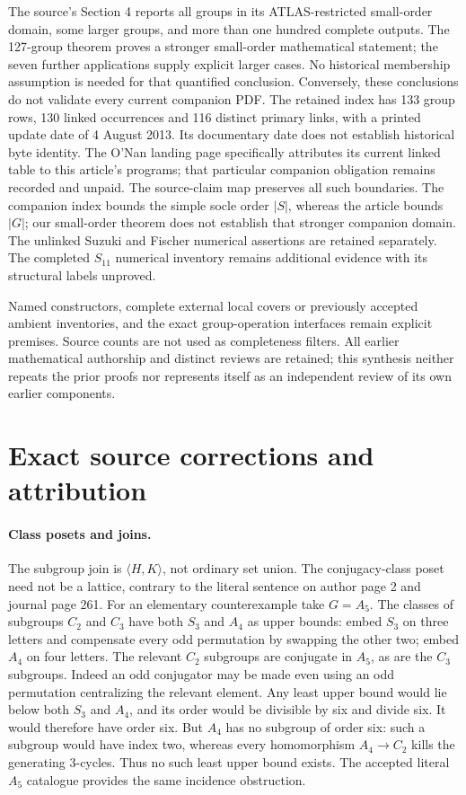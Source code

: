 \documentclass[11pt]{article}
\begin{document}
The source's Section 4 reports all groups in its ATLAS-restricted small-order
domain, some larger groups, and more than one hundred complete outputs.
The 127-group theorem proves a stronger small-order mathematical statement;
the seven further applications supply explicit larger cases. No historical
membership assumption is needed for that quantified conclusion. Conversely,
these conclusions do not validate every current companion PDF. The retained
index has 133 group rows, 130 linked occurrences and 116 distinct primary
links, with a printed update date of 4 August 2013. Its documentary date
does not establish historical byte identity. The O'Nan landing page
specifically attributes its current linked table to this article's programs;
that particular companion obligation remains recorded and unpaid. The
source-claim map preserves all such boundaries. The companion index bounds
the simple socle order $|S|$, whereas the article bounds $|G|$; our
small-order theorem does not establish that stronger companion domain.
The unlinked
Suzuki and Fischer numerical assertions are retained separately. The completed $S_{11}$ numerical
inventory remains additional evidence with its structural labels unproved.

Named constructors, complete external local covers or previously accepted
ambient inventories, and the exact group-operation interfaces remain
explicit premises. Source counts are not used as completeness filters.
All earlier mathematical authorship and distinct reviews are retained;
this synthesis neither repeats the prior proofs nor represents itself as
an independent review of its own earlier components.

\section{Exact source corrections and attribution}
\paragraph{Class posets and joins.}
The subgroup join is $\langle H,K\rangle$, not ordinary set union.
The conjugacy-class poset need not be a lattice, contrary to the literal
sentence on author page 2 and journal page 261.
For an elementary counterexample take $G=A_5$. The classes of subgroups
$C_2$ and $C_3$ have both $S_3$ and $A_4$ as upper bounds: embed $S_3$
on three letters and compensate every odd permutation by swapping the
other two; embed $A_4$ on four letters. The relevant $C_2$ subgroups are
conjugate in $A_5$, as are the $C_3$ subgroups. Indeed an odd conjugator
may be made even using an odd permutation centralizing the relevant element.
Any least upper bound would lie below both $S_3$ and $A_4$, and its order
would be divisible by six and divide six. It would therefore have order six.
But $A_4$ has no subgroup of order six: such a subgroup would have index two,
whereas every homomorphism $A_4\to C_2$ kills the generating 3-cycles.
Thus no such least upper bound exists. The accepted literal $A_5$ catalogue
provides the same incidence obstruction.
\end{document}
